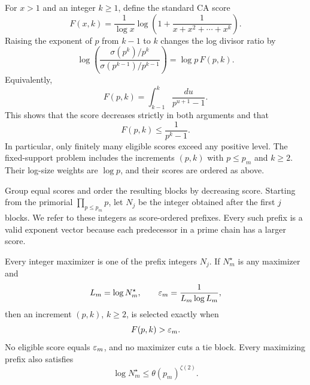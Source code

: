 For \(x>1\) and an integer \(k\geq1\), define the standard CA score
\cite[Section~4.1]{nicolas-2022-sigma}
\begin{equation}
\label{e-ca-score}
    F(x,k)
    =
    \frac1{\log x}
    \log\left(1+\frac1{x+x^2+\cdots+x^k}\right).
\end{equation}
Raising the exponent of \(p\) from \(k-1\) to \(k\) changes the log
divisor ratio by
\begin{equation}
\label{e-score-dictionary}
    \log\left(
        \frac{\sigma(p^k)/p^k}
             {\sigma(p^{k-1})/p^{k-1}}
    \right)
    =
    \log p\,F(p,k).
\end{equation}
Equivalently,
\begin{equation}
\label{e-score-integral}
    F(p,k)
    =
    \int_{k-1}^{k}\frac{du}{p^{u+1}-1}.
\end{equation}
This shows that the score decreases strictly in both arguments and that
\[
    F(p,k)\leq\frac1{p^k-1}.
\]
In particular, only finitely many eligible scores exceed any positive
level.
The fixed-support problem includes the increments \((p,k)\) with
\(p\leq p_m\) and \(k\geq2\). Their log-size weights are \(\log p\),
and their scores are ordered as above.

Group equal scores and order the resulting blocks by decreasing score.
Starting from the primorial \(\prod_{p\leq p_m}p\), let \(N_j\) be the
integer obtained after the first \(j\) blocks. We refer to these
integers as score-ordered prefixes. Every such prefix
is a valid exponent vector because each predecessor in a prime chain has
a larger score.

\begin{theorem}
\label{thm-integer-prefix}
Every integer maximizer is one of the prefix integers \(N_j\). If \(N_m^\star\)
is any maximizer and
\[
    L_m=\log N_m^\star,
    \qquad
    \varepsilon_m=\frac1{L_m\log L_m},
\]
then an increment \((p,k)\), \(k\geq2\), is selected exactly when
\begin{equation}
\label{e-integer-threshold}
    F(p,k)>\varepsilon_m.
\end{equation}
No eligible score equals \(\varepsilon_m\), and no maximizer cuts a tie block.
Every maximizing prefix also satisfies
\begin{equation}
\label{e-prefix-bound}
    \log N_m^\star\leq\theta(p_m)^{\zeta(2)}.
\end{equation}
\end{theorem}

